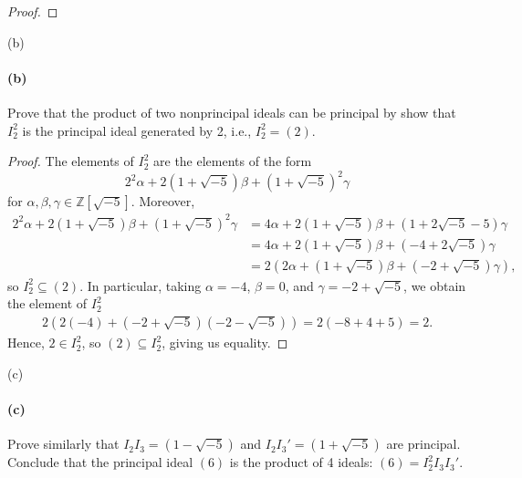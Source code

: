 \documentclass[12pt]{article}
\newenvironment{fullbox}{\begin{lrbox}{\savefullbox}\begin{minipage}{\dimexpr\textwidth-2\fboxsep\relax}}{\end{minipage}\end{lrbox}\begin{center}\framebox[\textwidth]{\usebox{\savefullbox}}\end{center}}
\newenvironment{pbox}[1][]{\begin{fullbox}\ifx#1\empty\else\paragraph{#1}\fi}{\end{fullbox}}
\theoremstyle{definition}
\newcommand{\Z}{\mathbb{Z}}
\begin{document}
\begin{proof}
\end{proof}

\begin{pbox}[(b)]
    Prove that the product of two nonprincipal ideals can be principal by show that $I_2^2$ is the principal ideal generated by 2, i.e., $I_2^2 = (2)$.
\end{pbox}

\begin{proof}
    The elements of $I_2^2$ are the elements of the form
    \[
        2^2\alpha + 2(1 + \sqrt{-5})\beta + (1 + \sqrt{-5})^2\gamma
    \]
    for $\alpha, \beta, \gamma \in \Z[\sqrt{-5}]$. Moreover,
    \begin{align*}
        2^2\alpha + 2(1 + \sqrt{-5})\beta + (1 + \sqrt{-5})^2\gamma
            &= 4\alpha + 2(1 + \sqrt{-5})\beta + (1 + 2\sqrt{-5} - 5)\gamma \\
            &= 4\alpha + 2(1 + \sqrt{-5})\beta + (-4 + 2\sqrt{-5})\gamma \\
            &= 2(2\alpha + (1 + \sqrt{-5})\beta + (-2 + \sqrt{-5})\gamma),
    \end{align*}
    so $I_2^2 \subseteq (2)$. In particular, taking $\alpha = -4$, $\beta = 0$, and $\gamma = -2 + \sqrt{-5}$, we obtain the element of $I_2^2$
    \begin{align*}
        2(2(-4) + (-2 + \sqrt{-5})(-2 - \sqrt{-5}))
            = 2(-8 + 4 + 5) 
            = 2.
    \end{align*}
    Hence, $2 \in I_2^2$, so $(2) \subseteq I_2^2$, giving us equality.
    
\end{proof}

\begin{pbox}[(c)]
    Prove similarly that $I_2 I_3= (1-\sqrt{-5})$ and $I_2 I_3' = (1+\sqrt{-5})$ are principal. Conclude that the principal ideal $(6)$ is the product of 4 ideals: $(6)=I_2^2 I_3 I_3'$.
\end{pbox}
\end{document}
